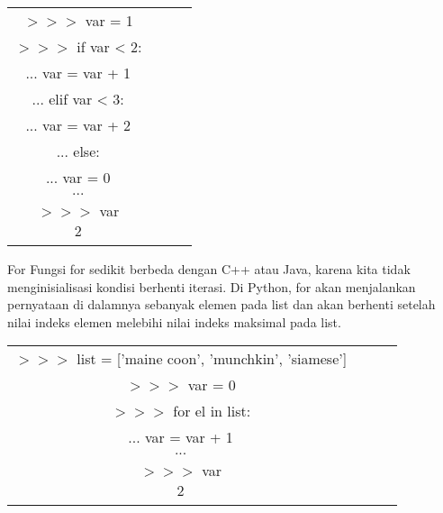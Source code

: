 \begin{tabular}{|c|c|c|c|}
\hline
$>>>$ var = 1 \\ \linebreak
$>>>$ if var < 2: \\ \linebreak
$...$ 	var = var + 1 \\ \linebreak
$...$ elif var < 3: \\ \linebreak
$...$ 	var = var + 2 \\ \linebreak
$...$ else: \\ \linebreak
$...$ 	var = 0 \\ \linebreak
$...$ \\ \linebreak
$>>>$ var \\ \linebreak
$2$ \\ \linebreak

\end{tabular}


For
Fungsi for sedikit berbeda dengan C++ atau Java, karena kita tidak menginisialisasi kondisi berhenti iterasi. Di Python, for akan menjalankan pernyataan di dalamnya sebanyak elemen pada list dan akan berhenti setelah nilai indeks elemen melebihi nilai indeks maksimal pada list.

\begin{tabular}{|c|c|c|c|}
\hline

$>>>$ list = ['maine coon', 'munchkin', 'siamese'] \\ \linebreak
$>>>$ var = 0  \\ \linebreak
$>>>$ for el in list: \\ \linebreak
$...$ 	var = var + 1 \\ \linebreak
$...$ \\ \linebreak
$>>>$ var \\ \linebreak
$2$ \\ \linebreak

\end{tabular}


